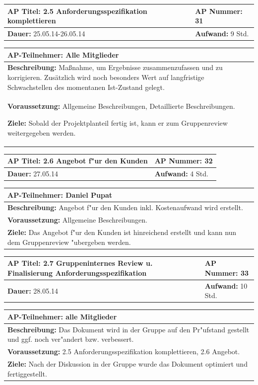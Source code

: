 \documentclass[fontsize=12pt,paper=a4,twoside]{scrartcl}
\begin{document}
\begin{tabular}{|p{7.43cm}|p{7.43cm}|}
\hline
\textbf{AP Titel: }2.5 Anforderungsspezifikation komplettieren & \textbf{AP Nummer: }31\\ 
\hline
\textbf{Dauer: }25.05.14-26.05.14 & \textbf{Aufwand: } 9 Std.\\
\hline
\end{tabular}
\begin{tabular}{|p{15.3cm}|}
\hline
\textbf{AP-Teilnehmer: }Alle Mitglieder\\
\hline
\textbf{Beschreibung: }Maßnahme, um Ergebnisse zusammenzufassen und zu korrigieren. Zusätzlich wird noch besonders Wert auf langfristige Schwachstellen des momentanen Ist-Zustand gelegt.\\
\hline
\textbf{Voraussetzung: }Allgemeine Beschreibungen, Detaillierte Beschreibungen.\

\textbf{Ziele: }Sobald der Projektplanteil fertig ist, kann er zum Gruppenreview weitergegeben werden.\\
\hline 
\end{tabular}

\begin{tabular}{|p{7.43cm}|p{7.43cm}|}
\hline
\textbf{AP Titel: }2.6 Angebot f"ur den Kunden & \textbf{AP Nummer: }32\\ 
\hline
\textbf{Dauer: }27.05.14 & \textbf{Aufwand: } 4 Std.\\
\hline
\end{tabular}
\begin{tabular}{|p{15.3cm}|}
\hline
\textbf{AP-Teilnehmer: }Daniel Pupat\\
\hline
\textbf{Beschreibung: }Angebot f"ur den Kunden inkl. Kostenaufwand wird erstellt.\\
\hline
\textbf{Voraussetzung: }Allgemeine Beschreibungen.\\
\hline 
\textbf{Ziele: }Das Angebot f"ur den Kunden ist hinreichend erstellt und kann nun dem Gruppenreview "ubergeben werden.\\
\hline 
\end{tabular}

\begin{tabular}{|p{7.43cm}|p{7.43cm}|}
\hline
\textbf{AP Titel: }2.7 Gruppeninternes Review u. Finalisierung Anforderungsspezifikation & \textbf{AP Nummer: }33\\ 
\hline
\textbf{Dauer: }28.05.14 & \textbf{Aufwand: } 10 Std.\\
\hline
\end{tabular}
\begin{tabular}{|p{15.3cm}|}
\hline
\textbf{AP-Teilnehmer: }alle Mitglieder\\
\hline
\textbf{Beschreibung: }Das Dokument wird in der Gruppe auf den Pr"ufstand gestellt und ggf. noch ver"andert bzw. verbessert.\\
\hline
\textbf{Voraussetzung: }2.5 Anforderungsspezifikation komplettieren, 2.6 Angebot.\\
\hline 
\textbf{Ziele: }Nach der Diskussion in der Gruppe wurde das Dokument optimiert und fertiggestellt.\\
\hline 
\end{tabular}
\end{document}
